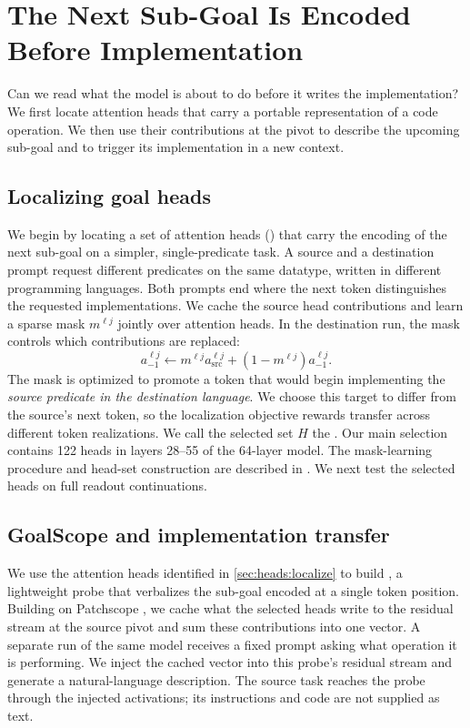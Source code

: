 \section{The Next Sub-Goal Is Encoded Before Implementation}
\label{sec:what}
Can we read what the model is about to do before it writes the implementation? We first locate attention heads that carry a portable representation of a code operation. We then use their contributions at the pivot to describe the upcoming sub-goal and to trigger its implementation in a new context.

\subsection{Localizing goal heads}
\label{sec:what:approach}
\label{sec:heads:localize}
We begin by locating a set of attention heads (\goalheads) that carry the encoding of the next sub-goal on a simpler, single-predicate task. A source and a destination prompt request different predicates on the same datatype, written in different programming languages. Both prompts end where the next token distinguishes the requested implementations. We cache the source head contributions and learn a sparse mask $m^{\ell j}$ jointly over attention heads. In the destination run, the mask controls which contributions are replaced:
\begin{equation}
a_{-1}^{\ell j}\leftarrow m^{\ell j}a_{\mathrm{src}}^{\ell j}+(1-m^{\ell j})a_{-1}^{\ell j}.
\label{eqn:opt-int}
\end{equation}
The mask is optimized to promote a token that would begin implementing the \emph{source predicate in the destination language}. We choose this target to differ from the source's next token, so the localization objective rewards transfer across different token realizations. We call the selected set $H$ the \goalheads. Our main selection contains 122 heads in layers 28--55 of the 64-layer model. The mask-learning procedure and head-set construction are described in . We next test the selected heads on full readout continuations.

\subsection{GoalScope and implementation transfer}
\label{sec:what:readout}
We use the attention heads identified in \ref{sec:heads:localize} to build \goalscope, a lightweight probe that verbalizes the sub-goal encoded at a single token position. Building on Patchscope \citep{ghandeharioun2024patchscope}, we cache what the selected heads write to the residual stream at the source pivot and sum these contributions into one vector. A separate run of the same model receives a fixed prompt asking what operation it is performing. We inject the cached vector into this probe's residual stream and generate a natural-language description. The source task reaches the probe through the injected activations; its instructions and code are not supplied as text.

